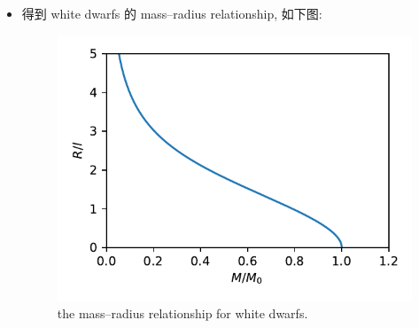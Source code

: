 \begin{itemize}
	\item 得到 white dwarfs 的 mass--radius relationship, 如下图:
	\begin{figure}[H]
		\centering
		\includegraphics[scale=1]{figures/the mass--radius relationship for white dwarfs.pdf}
		\caption{the mass--radius relationship for white dwarfs.}
	\end{figure}
\end{itemize}
